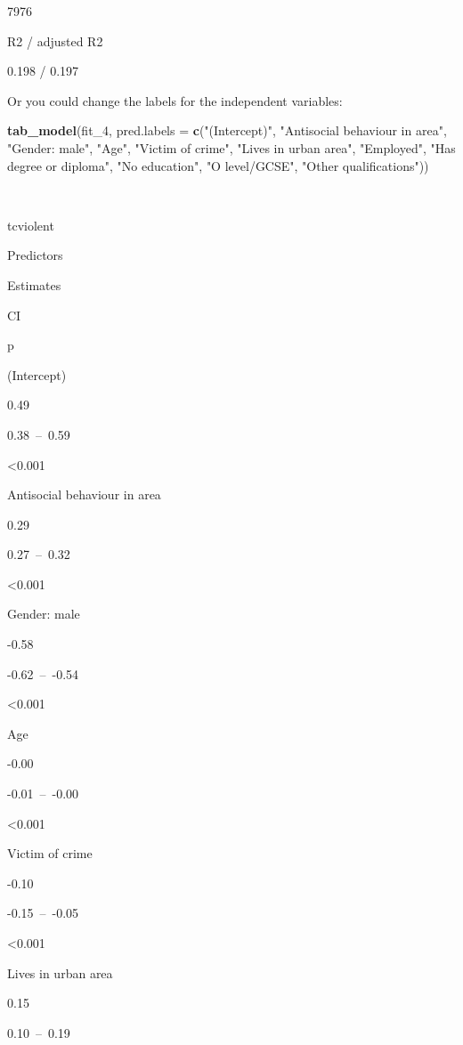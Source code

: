 \documentclass[]{book}
\newenvironment{Shaded}{\begin{snugshade}}{\end{snugshade}}
\newcommand{\DataTypeTok}[1]{\textcolor[rgb]{0.13,0.29,0.53}{#1}}
\newcommand{\DecValTok}[1]{\textcolor[rgb]{0.00,0.00,0.81}{#1}}
\newcommand{\KeywordTok}[1]{\textcolor[rgb]{0.13,0.29,0.53}{\textbf{#1}}}
\newcommand{\NormalTok}[1]{#1}
\newcommand{\StringTok}[1]{\textcolor[rgb]{0.31,0.60,0.02}{#1}}
\theoremstyle{definition}
\theoremstyle{definition}
\theoremstyle{definition}
\theoremstyle{remark}
\begin{document}
7976

R2 / adjusted R2

0.198 / 0.197

Or you could change the labels for the independent variables:

\begin{Shaded}
\begin{Highlighting}[]
\KeywordTok{tab_model}\NormalTok{(fit_}\DecValTok{4}\NormalTok{, }\DataTypeTok{pred.labels =} \KeywordTok{c}\NormalTok{(}\StringTok{"(Intercept)"}\NormalTok{, }\StringTok{"Antisocial behaviour in area"}\NormalTok{, }\StringTok{"Gender: male"}\NormalTok{, }\StringTok{"Age"}\NormalTok{, }\StringTok{"Victim of crime"}\NormalTok{, }\StringTok{"Lives in urban area"}\NormalTok{, }\StringTok{"Employed"}\NormalTok{, }\StringTok{"Has degree or diploma"}\NormalTok{, }\StringTok{"No education"}\NormalTok{, }\StringTok{"O level/GCSE"}\NormalTok{, }\StringTok{"Other qualifications"}\NormalTok{))}
\end{Highlighting}
\end{Shaded}

~

tcviolent

Predictors

Estimates

CI

p

(Intercept)

0.49

0.38~--~0.59

\textless{}0.001

Antisocial behaviour in area

0.29

0.27~--~0.32

\textless{}0.001

Gender: male

-0.58

-0.62~--~-0.54

\textless{}0.001

Age

-0.00

-0.01~--~-0.00

\textless{}0.001

Victim of crime

-0.10

-0.15~--~-0.05

\textless{}0.001

Lives in urban area

0.15

0.10~--~0.19
\end{document}
